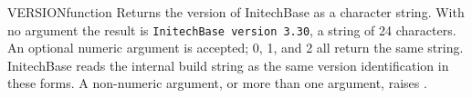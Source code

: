 \begin{XbaseEntry}{VERSION}{function}
Returns the version of InitechBase as a character string.
\Syntax
{}
\Usage
With no argument the result is \texttt{InitechBase version 3.30}, a string
of 24 characters. An optional numeric argument is accepted; 0, 1, and 2
all return the same string. InitechBase reads the internal build string
as the same version identification in these forms. A non-numeric argument,
or more than one argument, raises .
\Examples
{}
\end{XbaseEntry}

